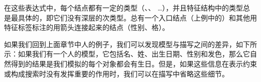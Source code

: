 在这些表达式中，每个结点都有一定的类型（、、 \ldots），并且特征结构中的类型总是最具体的，即它们没有深层的次类型。总有一个入口结点（上例中的）和其他用特征标签标注的用箭头连接起来的结点（\textsc{性别}、\textsc{格}）。

如果我们回到上面章节中人的例子，我们可以发现模型与描写之间的差异，如下所示：如果我们有一个人的模型，它包括名、姓、出生日期、性别和发色，那么它自然得到的结果是我们模拟的每个对象都会有生日。但是，如果这些信息在表示约束或构成搜索时没有发挥重要的作用时，我们可以在描写中省略这些细节。

